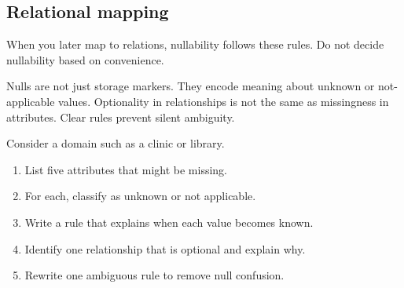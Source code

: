 \subsection{Relational mapping}
When you later map to relations, nullability follows these rules.
Do not decide nullability based on convenience.

\begin{chaptersummary}
Nulls are not just storage markers.
They encode meaning about unknown or not-applicable values.
Optionality in relationships is not the same as missingness in attributes.
Clear rules prevent silent ambiguity.
\end{chaptersummary}

\begin{exercisebox}
Consider a domain such as a clinic or library.
\begin{enumerate}[label=\arabic*.]
  \item List five attributes that might be missing.
  \item For each, classify as unknown or not applicable.
  \item Write a rule that explains when each value becomes known.
  \item Identify one relationship that is optional and explain why.
  \item Rewrite one ambiguous rule to remove null confusion.
\end{enumerate}
\end{exercisebox}

